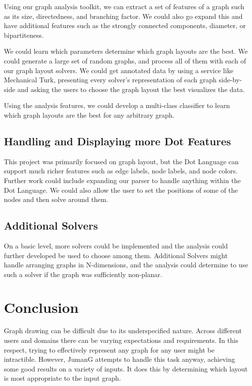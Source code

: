 \documentclass{article}
\begin{document}
Using our graph analysis toolkit, we can extract a set of features of a graph such as its size, directedness, and branching factor. We could also go expand this and have additional features such as the strongly connected components, diameter, or bipartiteness.

We could learn which parameters determine which graph layouts are the best. We could generate a large set of random graphs, and process all of them with each of our graph layout solvers. We could get annotated data by using a service like Mechanical Turk, presenting every solver's representation of each graph side-by-side and asking the users to choose the graph layout the best visualizes the data.

Using the analysis features, we could develop a multi-class classifier to learn which graph layouts are the best for any arbitrary graph.


\subsection{Handling and Displaying more Dot Features}
This project was primarily focused on graph layout, but the Dot Language can support much richer features such as edge labels, node labels, and node colors. Further work could include expanding our parser to handle anything within the Dot Language. We could also allow the user to set the positions of some of the nodes and then solve around them.


\subsection{Additional Solvers}
On a basic level, more solvers could be implemented and the analysis could further developed be used to choose among them. Additional Solvers might handle arranging graphs in N-dimensions, and the analysis could determine to use such a solver if the graph was sufficiently non-planar.



\section{Conclusion}
Graph drawing can be difficult due to its underspecified nature. Across different users and domains there can be varying expectations and requirements. In this respect, trying to effectively represent any graph for any user might be intractible. However, JumanG attempts to handle this task anyway, achieving some good results on a variety of inputs. It does this by determining which layout is most appropriate to the input graph.
\end{document}
